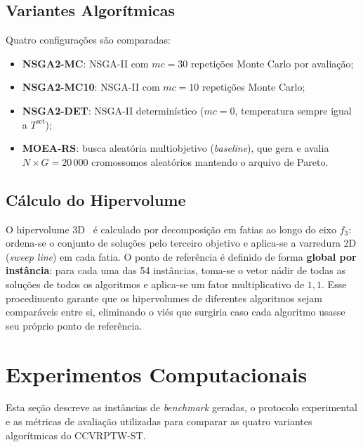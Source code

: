 \documentclass[a4paper,11pt]{article}
\newcommand{\nsmc}{NSGA2\mbox{-}MC\xspace}
\newcommand{\nsmx}{NSGA2\mbox{-}MC10\xspace}
\newcommand{\nsdet}{NSGA2\mbox{-}DET\xspace}
\newcommand{\moers}{MOEA\mbox{-}RS\xspace}
\begin{document}
\subsection{Variantes Algorítmicas}

Quatro configurações são comparadas:

\begin{itemize}
  \item \textbf{\nsmc}: NSGA-II com $mc = 30$ repetições Monte Carlo por avaliação;
  \item \textbf{\nsmx}: NSGA-II com $mc = 10$ repetições Monte Carlo;
  \item \textbf{\nsdet}: NSGA-II determinístico ($mc = 0$, temperatura sempre
        igual a $T^{\mathrm{set}}$);
  \item \textbf{\moers}: busca aleatória multiobjetivo (\textit{baseline}),
        que gera e avalia $N \times G = 20\,000$ cromossomos aleatórios
        mantendo o arquivo de Pareto.
\end{itemize}

\subsection{Cálculo do Hipervolume}

O hipervolume 3D~\citep{zitzler:1998} é calculado por decomposição em fatias
ao longo do eixo $f_3$: ordena-se o conjunto de soluções pelo terceiro objetivo
e aplica-se a varredura 2D (\textit{sweep line}) em cada fatia.
O ponto de refer\^encia é definido de forma \textbf{global por inst\^ancia}:
para cada uma das 54 inst\^ancias, toma-se o vetor nádir de todas as soluções
de todos os algoritmos e aplica-se um fator multiplicativo de $1{,}1$.
Esse procedimento garante que os hipervolumes de diferentes algoritmos sejam
comparáveis entre si, eliminando o viés que surgiria caso cada algoritmo
usasse seu próprio ponto de refer\^encia.

\section{Experimentos Computacionais}

Esta seção descreve as instâncias de \textit{benchmark} geradas, o protocolo experimental e as métricas de avaliação utilizadas para comparar as quatro variantes algorítmicas do CCVRPTW-ST.
\end{document}
